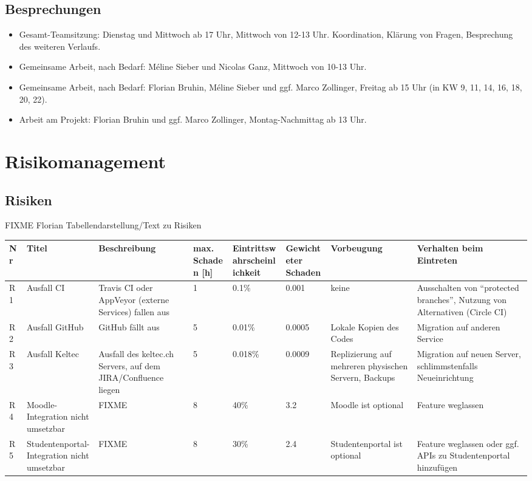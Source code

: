 \documentclass[a4paper]{article}
\begin{document}
\subsection{Besprechungen}
\begin{itemize}
\item Gesamt-Teamsitzung: Dienstag und Mittwoch ab 17 Uhr, Mittwoch von 12-13 Uhr. Koordination, Klärung von Fragen, Besprechung des weiteren Verlaufs.
\item Gemeinsame Arbeit, nach Bedarf: Méline Sieber und Nicolas Ganz, Mittwoch von 10-13 Uhr.
\item Gemeinsame Arbeit, nach Bedarf: Florian Bruhin, Méline Sieber und ggf. Marco Zollinger, Freitag ab 15 Uhr (in KW 9, 11, 14, 16, 18, 20, 22).
\item Arbeit am Projekt: Florian Bruhin und ggf. Marco Zollinger, Montag-Nachmittag ab 13 Uhr.
\end{itemize}

\section{Risikomanagement}
\begin{landscape}
\subsection{Risiken}

FIXME Florian Tabellendarstellung/Text zu Risiken
\thispagestyle{empty}

\begin{tabular}{ll>{\raggedright}p{8em}lll>{\raggedright}p{8em}p{15em}}
  \toprule
  Nr & Titel & Beschreibung & max. Schaden [h] & Eintrittswahrscheinlichkeit & Gewichteter Schaden & Vorbeugung & Verhalten beim Eintreten \\
  \midrule
  R1 & Ausfall CI & Travis CI oder AppVeyor (externe Services) fallen aus & 1 & 0.1\% & 0.001 & keine & Ausschalten von ``protected branches'', Nutzung von Alternativen (Circle CI) \\
  R2 & Ausfall GitHub & GitHub fällt aus & 5 & 0.01\% & 0.0005 & Lokale Kopien des Codes & Migration auf anderen Service \\
  R3 & Ausfall Keltec & Ausfall des keltec.ch Servers, auf dem JIRA/Confluence liegen & 5 & 0.018\% & 0.0009 & Replizierung auf mehreren physischen Servern, Backups & Migration auf neuen Server, schlimmstenfalls Neueinrichtung \\
  R4 & Moodle-Integration nicht umsetzbar & FIXME & 8 & 40\% & 3.2 & Moodle ist optional & Feature weglassen \\
  R5 & Studentenportal-Integration nicht umsetzbar & FIXME & 8 & 30\% & 2.4 & Studentenportal ist optional & Feature weglassen oder ggf. APIs zu Studentenportal hinzufügen \\
  \bottomrule
\end{tabular}
\end{landscape}
\end{document}
